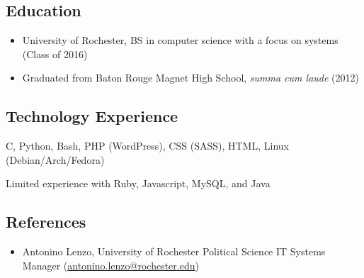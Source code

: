 \documentclass[10pt]{article}
\begin{document}
\subsection*{Education}

\begin{itemize}
	\item University of Rochester, BS in computer science with a focus on systems (Class of 2016)
	\item Graduated from Baton Rouge Magnet High School, \textit{summa cum laude} (2012)
\end{itemize}





\subsection*{Technology Experience}

C, Python, Bash, PHP (WordPress), CSS (SASS), HTML, Linux (Debian/Arch/Fedora)

Limited experience with Ruby, Javascript, MySQL, and Java



\subsection*{References}

\begin{itemize}
	\item Antonino Lenzo, University of Rochester Political Science IT Systems Manager (\href{mailto://antonino.lenzo@rochester.edu}{antonino.lenzo@rochester.edu})
\end{itemize}
\end{document}
